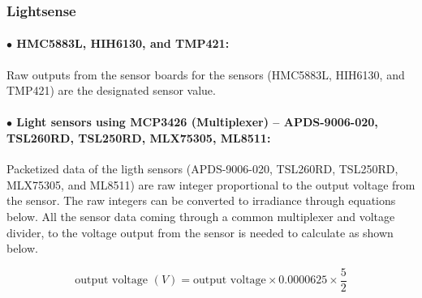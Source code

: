 


\bigbreak
\subsubsection{Lightsense}

\paragraph{$\bullet$ HMC5883L, HIH6130, and TMP421:}
Raw outputs from the sensor boards for the sensors (HMC5883L, HIH6130, and TMP421) are the designated sensor value.

\paragraph{$\bullet$ Light sensors using MCP3426 (Multiplexer) -- APDS-9006-020, TSL260RD, TSL250RD, MLX75305, ML8511:}
Packetized data of the ligth sensors (APDS-9006-020, TSL260RD, TSL250RD, MLX75305, and ML8511) are raw integer proportional to the output voltage from the sensor.  The raw integers can be converted to irradiance through equations below. 
\newline \newline
All the sensor data coming through a common multiplexer and voltage divider, to the voltage output from the sensor is needed to calculate as shown below.

\bigbreak

{\centering
 \[ \text{output voltage }(V) =  \text{output voltage} \times 0.0000625 \times \frac{5}{2} \]
 \par
 }

